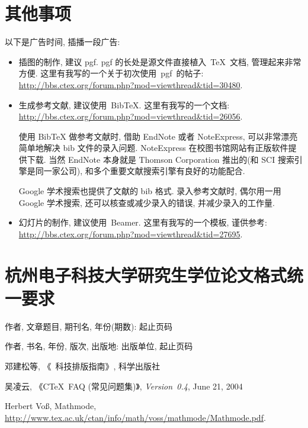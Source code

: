 \documentclass[forlib]{HDUMaster}   %
\begin{document}
\chapter{其他事项}
以下是广告时间, 插播一段广告:
\begin{itemize}
    \item 插图的制作, 建议 pgf.
          pgf 的长处是源文件直接植入~\TeX~文档, 管理起来非常方便.
    这里有我写的一个关于初次使用~pgf~的帖子:\\    \url{http://bbs.ctex.org/forum.php?mod=viewthread&tid=30480}.
    \item 生成参考文献, 建议使用~BibTeX.  这里有我写的一个文档: \\
    \url{http://bbs.ctex.org/forum.php?mod=viewthread&tid=26056}.

      {\kaishu 使用 BibTeX{} 做参考文献时,
      借助 EndNote 或者 NoteExpress, 可以非常漂亮简单地解决 bib 文件的录入问题.
      NoteExpress 在校图书馆网站有正版软件提供下载.
      当然 EndNote 本身就是 Thomson Corporation 推出的(和 SCI 搜索引擎是同一家公司),
      和多个重要文献搜索引擎有良好的功能配合.

      Google 学术搜索也提供了文献的 bib 格式.
      录入参考文献时, 偶尔用一用 Google 学术搜索, 还可以核查或减少录入的错误, 并减少录入的工作量.}
     \item 幻灯片的制作, 建议使用~Beamer. 这里有我写的一个模板, 谨供参考:\\
    \url{http://bbs.ctex.org/forum.php?mod=viewthread&tid=27695}.
\end{itemize}

\chapter{杭州电子科技大学研究生学位论文格式统一要求}


\cleardoublepage{}
{}
\begin{thebibliography}{000}

   作者, 文章题目, 期刊名, 年份(期数): 起止页码

   作者, 书名, 年份, 版次, 出版地: 出版单位, 起止页码

   邓建松等, 《\LaTeXe~科技排版指南》, 科学出版社

   吴凌云, 《CTeX~FAQ (常见问题集)》, \textit{Version~0.4}, June 21, 2004

   Herbert Vo\ss, Mathmode, \url{http://www.tex.ac.uk/ctan/info/math/voss/mathmode/Mathmode.pdf}.

\end{thebibliography}



\backmatter

\cleardoublepage
\end{document}
